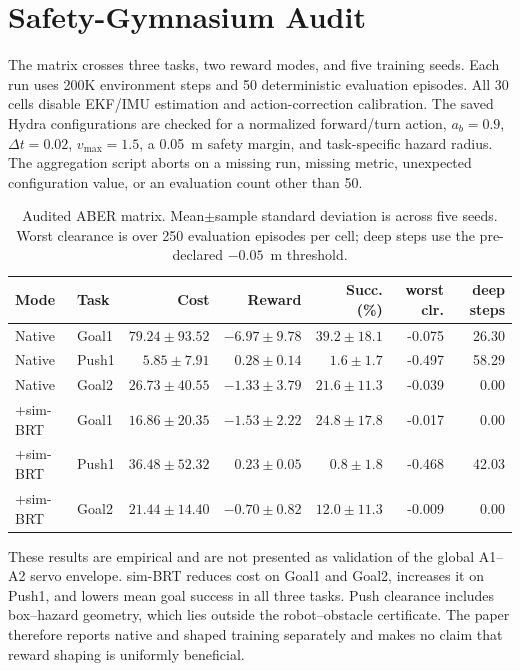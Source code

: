 \documentclass[letterpaper]{article}
\begin{document}
\section{Safety-Gymnasium Audit}

The matrix crosses three tasks, two reward modes, and five training seeds.
Each run uses 200K environment steps and 50 deterministic evaluation episodes.
All 30 cells disable EKF/IMU estimation and action-correction calibration.
The saved Hydra configurations are checked for a normalized forward/turn
action, $a_b=0.9$, $\Delta t=0.02$, $v_{\max}=1.5$, a 0.05~m safety margin,
and task-specific hazard radius.  The aggregation script aborts on a missing
run, missing metric, unexpected configuration value, or an evaluation count
other than 50.

\begin{table}[t]
\centering
\small
\setlength{\tabcolsep}{4.0pt}
\begin{tabular}{llrrrrr}
\toprule
Mode & Task & Cost & Reward & Succ. (\%) & worst clr. & deep steps\\
\midrule
Native & Goal1 & $79.24\pm93.52$ & $-6.97\pm9.78$ & $39.2\pm18.1$ & -0.075 & 26.30\\
Native & Push1 & $5.85\pm7.91$ & $0.28\pm0.14$ & $1.6\pm1.7$ & -0.497 & 58.29\\
Native & Goal2 & $26.73\pm40.55$ & $-1.33\pm3.79$ & $21.6\pm11.3$ & -0.039 & 0.00\\
\midrule
+sim-BRT & Goal1 & $16.86\pm20.35$ & $-1.53\pm2.22$ & $24.8\pm17.8$ & -0.017 & 0.00\\
+sim-BRT & Push1 & $36.48\pm52.32$ & $0.23\pm0.05$ & $0.8\pm1.8$ & -0.468 & 42.03\\
+sim-BRT & Goal2 & $21.44\pm14.40$ & $-0.70\pm0.82$ & $12.0\pm11.3$ & -0.009 & 0.00\\
\bottomrule
\end{tabular}
\caption{Audited ABER matrix.  Mean$\pm$sample standard deviation is across
five seeds.  Worst clearance is over 250 evaluation episodes per cell; deep
steps use the pre-declared $-0.05$~m threshold.}
\label{tab:sgfull}
\end{table}

These results are empirical and are not presented as validation of the global
A1--A2 servo envelope.  sim-BRT reduces cost on Goal1 and Goal2, increases it
on Push1, and lowers mean goal success in all three tasks.  Push clearance
includes box--hazard geometry, which lies outside the robot--obstacle
certificate.  The paper therefore reports native and shaped training
separately and makes no claim that reward shaping is uniformly beneficial.
\end{document}
